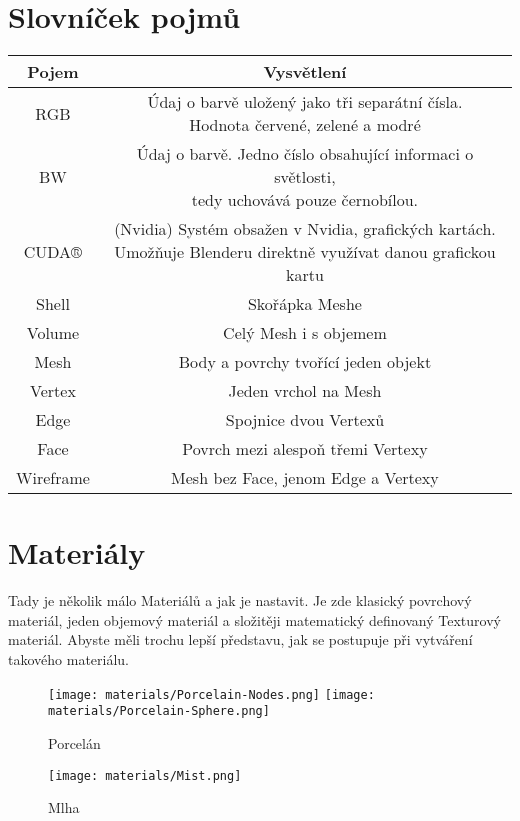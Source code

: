 \documentclass[12pt,a4paper]{report}
\begin{document}
	\section{Slovníček pojmů}
	\begin{tabular}{cc}
		\toprule
		Pojem & Vysvětlení
\\
		\midrule
		RGB & \makecell{Údaj o barvě uložený jako tři
separátní čísla.\\ Hodnota červené,
zelené a modré} \\
		BW & \makecell{Údaj o barvě. Jedno číslo
obsahující informaci o světlosti, \\
tedy uchovává pouze černobílou.}
\\
		CUDA® & \makecell{(Nvidia) Systém obsažen v Nvidia,
grafických kartách.\\ Umožňuje
Blenderu direktně využívat danou
grafickou kartu}
\\
		Shell & Skořápka Meshe
\\
		Volume & Celý Mesh i s objemem
\\
		Mesh & Body a povrchy tvořící jeden
objekt
\\
		Vertex & Jeden vrchol na Mesh
\\
		Edge & Spojnice dvou Vertexů
\\
		Face & Povrch mezi alespoň třemi Vertexy
\\
		Wireframe & Mesh bez Face, jenom Edge a
Vertexy
	\end{tabular}
	
	\section{Materiály}
	Tady je několik málo Materiálů a jak je nastavit. Je zde klasický
	povrchový materiál, jeden objemový materiál a složitěji matematický
	definovaný Texturový materiál. Abyste měli trochu lepší představu, jak se
	postupuje při vytváření takového materiálu.
	
	\begin{figure}[h]
		\centering
		\texttt{[image: materials/Porcelain-Nodes.png]}
		\texttt{[image: materials/Porcelain-Sphere.png]}
		\caption{Porcelán}
		\label{pic:material-porcelain}
	\end{figure}

	\begin{figure}[h]
		\centering
		\texttt{[image: materials/Mist.png]}
		\caption{Mlha}
		\label{pic:material-mist}
	\end{figure}
	
\end{document}
